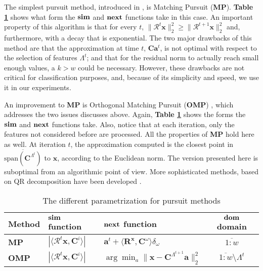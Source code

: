 \documentclass[runningheads,a4paper]{llncs}
\newcommand{\hcrange}[2]{\overline{{#1}\colon\!\!{#2}}}
\begin{document}
The simplest pursuit method, introduced in \cite{matchingpursuit1}, is Matching Pursuit (\textbf{MP}). \textbf{Table \ref{table:PursuitParametrization}} shows what form the $\text{\textbf{sim}}$ and $\text{\textbf{next}}$ functions take in this case. An important property of this algorithm is that for every $t$, $\|\mathcal{R}^t\textbf{x}\|_2^2 \geq \|\mathcal{R}^{t+1}\textbf{x}\|_2^2$ and, furthermore, with a decay that is exponential. The two major drawbacks of this method are that the approximation at time $t$, $\textbf{C}\textbf{a}^t$, is not optimal with respect to the selection of features $\Lambda^t$; and that for the residual norm to actually reach small enough values, a $k > w$ could be necessary. However, these drawbacks are not critical for classification purposes, and, because of its simplicity and speed, we use it in our experiments.

An improvement to \textbf{MP} is Orthogonal Matching Pursuit (\textbf{OMP}) \cite{matchingpursuit2,orthopursuit,pursuitdifferences}, which addresses the two issues discusses above. Again, \textbf{Table \ref{table:PursuitParametrization}} shows the forms the $\text{\textbf{sim}}$ and $\text{\textbf{next}}$ functions take. Also, notice that at each iteration, only the features not considered before are processed. All the properties of \textbf{MP} hold here as well. At iteration $t$, the approximation computed is the closest point in $\overline{\text{span}(\textbf{C}^{\Lambda^t})}$ to $\textbf{x}$, according to the Euclidean norm. The version presented here is suboptimal from an algorithmic point of view. More sophisticated methods, based on QR decomposition have been developed \cite{matchingpursuit2,pursuitdifferences}.

\renewcommand{\arraystretch}{1.5}
\begin{table}
  \caption{The different parametrization for pursuit methods}
  \label{table:PursuitParametrization}
  \begin{tabularx}{\textwidth}{|l|>{\centering}X|>{\centering}X|c|}
       \hline
        Method & $\text{\textbf{sim}}$ function & $\text{\textbf{next}}$ function & $\text{\textbf{dom}}$ domain\\ \hline \hline
        \textbf{MP} & $\left| \langle \mathcal{R}^t\textbf{x} , \textbf{C}^i \rangle \right|$ & $\textbf{a}^t + \langle \textbf{R}^\textbf{x} , \textbf{C}^\omega \rangle \delta_\omega$ & $\hcrange{1}{w}$ \\  \hline
        \textbf{OMP} & $\left| \langle \mathcal{R}^t\textbf{x} , \textbf{C}^i \rangle \right|$ & $\arg\min_{a} {\| \textbf{x} - \textbf{C}^{\Lambda^{t+1}}\textbf{a} \|_2^2}$ & $\hcrange{1}{w} \setminus \Lambda^t$ \\
       \hline
    \end{tabularx}
\end{table}
\renewcommand{\arraystretch}{1.0}
\end{document}
